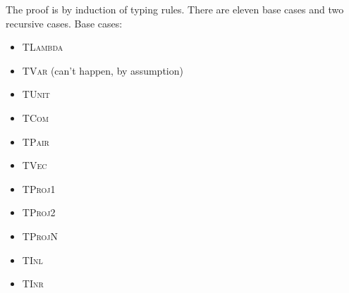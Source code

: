 The proof is by induction of typing rules.
There are eleven base cases and two recursive cases.
Base cases:
\begin{itemize}
\item \textsc{TLambda}
\item \textsc{TVar} (can't happen, by assumption)
\item \textsc{TUnit}
\item \textsc{TCom}
\item \textsc{TPair}
\item \textsc{TVec}
\item \textsc{TProj1}
\item \textsc{TProj2}
\item \textsc{TProjN}
\item \textsc{TInl}
\item \textsc{TInr}
\end{itemize}

